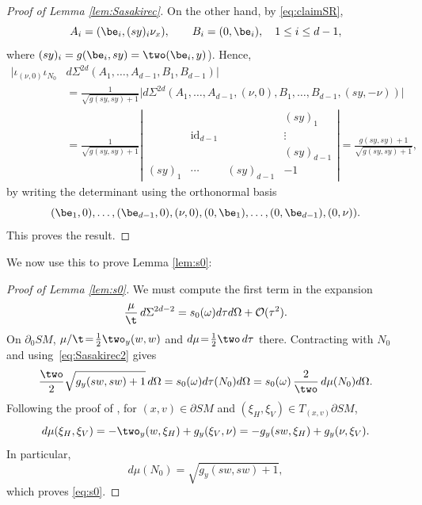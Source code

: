 \begin{proof}[Proof of Lemma \ref{lem:Sasakirec}]
On the other hand, by \eqref{eq:claimSR},\vspace*{-3pt}
\begin{equation*}
A_i = (\be_i, (sy)_i \nu_x), \qquad B_i = (0,\be_i), \quad 1\le i\le d-1,
\end{equation*}
where $(sy)_i = g(\be_i, sy) = \two(\be_i,y)$). Hence,\vspace*{-3pt}
\begin{align*}
\bigl|\iota_{(\nu,0)} \iota_{N_0} &d\Sigma^{2d} (A_1,\dots,A_{d-1}, B_1, B_{d-1})\bigr| \\
&= \frac{1}{\sqrt{g(sy,sy)+1}} \bigl|d\Sigma^{2d} (A_1,\dots,A_{d-1}, (\nu,0), B_1,\dots, B_{d-1}, (sy,-\nu))\bigr| \\
&= \frac{1}{\sqrt{g(sy,sy)+1}} \left|
\begin{array}{ccc|c}
& & & (sy)_1 \\
& \mathrm{id}_{d-1} & & \vdots \\
& & & (sy)_{d-1} \\
\hline
(sy)_1 & \cdots & (sy)_{d-1} & -1
\end{array}
\right| = \frac{g(sy,sy)+1}{\sqrt{g(sy,sy)+1}},
\end{align*}
by writing the determinant using the orthonormal basis\vspace*{-3pt}
\begin{equation*}
(\be_1,0), \dots, (\be_{d-1},0), (\nu,0), (0,\be_1), \dots, (0,\be_{d-1}),(0,\nu)).
\end{equation*}
This proves the result.
\end{proof}

We now use this to prove Lemma \ref{lem:s0}:

\begin{proof}[Proof of Lemma \ref{lem:s0}] We must compute the first term in the expansion
\begin{equation*}
\frac{\mu}{\t}\, d\Sigma^{2d-2} = s_0(\omega) d\tau d\Omega + {\cal O}(\tau^2).
\end{equation*}
On $\partial_0 SM$, $\mu/\t \!=\! \frac12 \two_y(w,w)$ and $d\mu \!=\! \frac12 \two\, d\tau$ there. Contracting
with $N_0$ and using~\eqref{eq:Sasakirec2} gives
\begin{equation*}
\frac{\two}{2} \sqrt{g_y(sw,sw)+1}\,d\Omega = s_0 (\omega) d\tau(N_0) d\Omega = s_0(\omega)\, \frac{2}{\two}\, d\mu(N_0) d\Omega.
\end{equation*}
Following the proof of \cite[Lem.\,3.3.6]{Paternain2021}, for $(x,v)\in \partial SM$ and $(\xi_H,\xi_V) \in T_{(x,v)} \partial SM$,
\begin{equation*}
d\mu (\xi_H, \xi_V) = - \two_y (w,\xi_H) + g_y(\xi_V, \nu) = - g_y(sw, \xi_H) + g_y(\nu, \xi_V).
\end{equation*}
In particular,
\begin{equation*}
d\mu(N_0) = \sqrt{g_y(sw,sw) + 1},
\end{equation*}
which proves \eqref{eq:s0}.
\end{proof}

